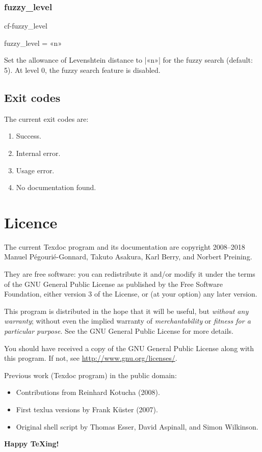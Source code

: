 \documentclass[a4paper, oneside]{scrartcl}
\newif\ifframed
\newenvironment{cmdsubsub}[2]{%
  \framedfalse \commandes\subsubsection{#1}{#2}%
  }{%
  \endcommandes}
\begin{document}
\begin{cmdsubsub}{fuzzy_level}{cf-fuzzy_level}
  fuzzy_level = «n»
\end{cmdsubsub}

Set the allowance of Levenshtein distance to |«n»| for the fuzzy search
(default: 5). At level 0, the fuzzy search feature is disabled.

\subsection{Exit codes}\label{ss-exit}

The current exit codes are:
\begin{enumerate}[start=0]
  \item Success.
  \item Internal error.
  \item Usage error.
  \item No documentation found.
\end{enumerate}

\section{Licence}\label{s-licence}

The current Texdoc program and its documentation are copyright 2008--2018
Manuel Pégourié-Gonnard, Takuto Asakura, Karl Berry, and Norbert Preining.

They are free software: you can redistribute it and/or modify it under the
terms of the GNU General Public License as published by the Free Software
Foundation, either version 3 of the License, or (at your option) any later
version.

This program is distributed in the hope that it will be useful, but
\emph{without any warranty}; without even the implied warranty of
\emph{merchantability} or \emph{fitness for a particular purpose}.  See the
GNU General Public License for more details.

You should have received a copy of the GNU General Public License along with
this program.  If not, see \url{http://www.gnu.org/licenses/}.

\bigskip

Previous work (Texdoc program) in the public domain:
\begin{itemize}
  \item Contributions from Reinhard Kotucha (2008).
  \item First texlua versions by Frank Küster (2007).
  \item Original shell script by Thomas Esser, David Aspinall, and Simon
	Wilkinson.
\end{itemize}

\bigskip
\begin{center}\Large\bfseries
  Happy {\TeX}ing!
\end{center}
\end{document}

